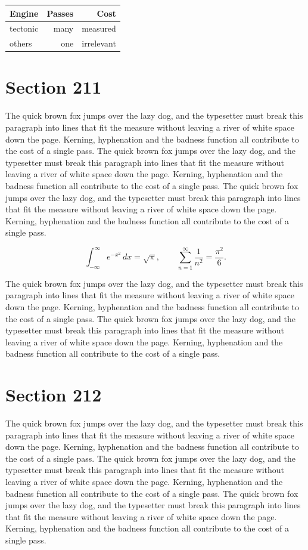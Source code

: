 \documentclass{article}
\begin{document}
\begin{center}
\begin{tabular}{lrr}
\toprule
Engine & Passes & Cost \\
\midrule
tectonic & many & measured \\
others & one & irrelevant \\
\bottomrule
\end{tabular}
\end{center}

\section{Section 211}
The quick brown fox jumps over the lazy dog, and the typesetter must break this paragraph into lines that fit the measure without leaving a river of white space down the page. Kerning, hyphenation and the badness function all contribute to the cost of a single pass. The quick brown fox jumps over the lazy dog, and the typesetter must break this paragraph into lines that fit the measure without leaving a river of white space down the page. Kerning, hyphenation and the badness function all contribute to the cost of a single pass. The quick brown fox jumps over the lazy dog, and the typesetter must break this paragraph into lines that fit the measure without leaving a river of white space down the page. Kerning, hyphenation and the badness function all contribute to the cost of a single pass. 

\begin{equation}
\int_{-\infty}^{\infty} e^{-x^{2}}\,dx = \sqrt{\pi}, \qquad
\sum_{n=1}^{\infty} \frac{1}{n^{2}} = \frac{\pi^{2}}{6}.
\end{equation}

The quick brown fox jumps over the lazy dog, and the typesetter must break this paragraph into lines that fit the measure without leaving a river of white space down the page. Kerning, hyphenation and the badness function all contribute to the cost of a single pass. The quick brown fox jumps over the lazy dog, and the typesetter must break this paragraph into lines that fit the measure without leaving a river of white space down the page. Kerning, hyphenation and the badness function all contribute to the cost of a single pass. 
\section{Section 212}
The quick brown fox jumps over the lazy dog, and the typesetter must break this paragraph into lines that fit the measure without leaving a river of white space down the page. Kerning, hyphenation and the badness function all contribute to the cost of a single pass. The quick brown fox jumps over the lazy dog, and the typesetter must break this paragraph into lines that fit the measure without leaving a river of white space down the page. Kerning, hyphenation and the badness function all contribute to the cost of a single pass. The quick brown fox jumps over the lazy dog, and the typesetter must break this paragraph into lines that fit the measure without leaving a river of white space down the page. Kerning, hyphenation and the badness function all contribute to the cost of a single pass. 
\end{document}

